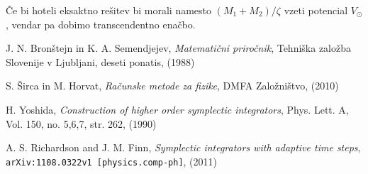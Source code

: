 \documentclass[12pt, a4paper]{article}
\begin{document}
\v Ce bi hoteli eksaktno re\v sitev bi morali namesto $(M_1 + M_2)/\zeta$ vzeti potencial $V_\odot$, vendar pa dobimo
transcendentno ena\v cbo.

\begin{thebibliography}{9}
		J. N. Bron\v stejn in K. A. Semendjejev,
		{\em Matemati\v cni priro\v cnik},
		Tehni\v ska zalo\v zba Slovenije v Ljubljani,
		deseti ponatis,
		(1988)

        S. \v Sirca in M. Horvat,
        {\em Ra\v cunske metode za fizike},
        DMFA Zalo\v zni\v stvo,
        (2010)

        H. Yoshida,
        \emph{Construction of higher order symplectic integrators},
        Phys. Lett. A,
        Vol. 150, no. 5,6,7, str. 262,
        (1990)

        A. S. Richardson and J. M. Finn,
        \emph{Symplectic integrators with adaptive time steps},
        {\tt arXiv:1108.0322v1 [physics.comp-ph]},
        (2011)
\end{thebibliography}
\end{document}
